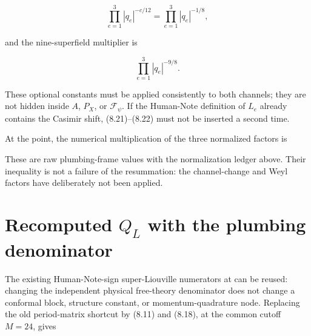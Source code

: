 \documentclass[11pt]{article}
\begin{document}
\[
 \prod_{e=1}^3|q_e|^{-c/12}
 =\prod_{e=1}^3|q_e|^{-1/8},
\tag{8.21}
\]

and the nine-superfield multiplier is

\[
 \prod_{e=1}^3|q_e|^{-9/8}.
\tag{8.22}
\]

These optional constants must be applied consistently to both channels;
they are not hidden inside \(A\), \(P_X\), or \(\mathcal F_\psi\).
If the Human-Note definition of \(L_e\) already contains the Casimir shift,
(8.21)--(8.22) must not be inserted a second time.

At the \texttt{} point, the numerical multiplication of the
three normalized factors is

\begin{center}
\small
{}
\end{center}

These are raw plumbing-frame values with the normalization ledger above.
Their inequality is not a failure of the resummation: the channel-change and
Weyl factors have deliberately not been applied.

\section{Recomputed \texorpdfstring{\(Q_L\)}{Q L} with the plumbing denominator}

The existing Human-Note-sign super-Liouville numerators at
\texttt{} can be reused: changing the
independent physical free-theory denominator does not change a conformal
block, structure constant, or momentum-quadrature node.  Replacing the old
period-matrix shortcut by (8.11) and (8.18), at the common cutoff \(M=24\),
gives

\begin{center}
\small
{}
\end{center}
\end{document}
